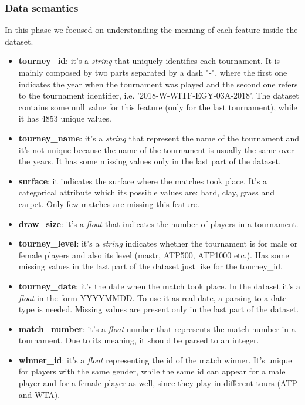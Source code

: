 \subsubsection{Data semantics}
In this phase we focused on understanding the meaning of each feature inside the dataset.
\begin{itemize}
    \item \textbf{tourney\_id}: it's a \textit{string} that uniquely identifies each tournament. It is mainly composed by two parts separated by a dash "-", where the first one indicates the year when the tournament was played and the second one refers to the tournament identifier, i.e. '2018-W-WITF-EGY-03A-2018'. The dataset contains some null value for this feature (only for the last tournament), while it has 4853 unique values.
    \item \textbf{tourney\_name}: it's a \textit{string} that represent the name of the tournament and it's not unique because the name of the tournament is usually the same over the years. It has some missing values only in the last part of the dataset.
    \item \textbf{surface}: it indicates the surface where the matches took place. It's a categorical attribute which its possible values are: hard, clay, grass and carpet. Only few matches are missing this feature.
    \item \textbf{draw\_size}: it's a \textit{float} that indicates the number of players in a tournament.
    \item \textbf{tourney\_level}: it's a \textit{string} indicates whether the tournament is for male or female players and also its level (mastr, ATP500, ATP1000 etc.). Has some missing values in the last part of the dataset just like for the tourney\_id.
    \item \textbf{tourney\_date}: it's the date when the match took place. In the dataset it's a \textit{float} in the form YYYYMMDD. To use it as real date, a parsing to a date type is needed. Missing values are present only in the last part of the dataset.
    \item \textbf{match\_number}: it's a \textit{float} number that represents the match number in a tournament. Due to its meaning, it should be parsed to an integer.
    \item \textbf{winner\_id}: it's a \textit{float} representing the id of the match winner. It's unique for players with the same gender, while the same id can appear for a male player and for a female player as well, since they play in different tours (ATP and WTA).

\end{itemize}
